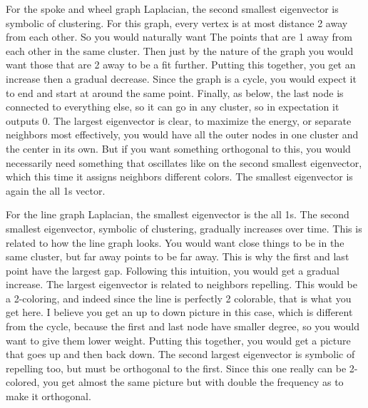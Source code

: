 \documentclass[12pt]{article}
\begin{document}
\begin{enumerate}[leftmargin=\labelsep, label=(\alph*)]
        For the spoke and wheel graph Laplacian, the second smallest eigenvector is symbolic of clustering. For this graph, every vertex is at most distance 2 away from each other. So you would naturally want The points that are 1 away from each other in the same cluster. Then just by the nature of the graph you would want those that are 2 away to be a fit further. Putting this together, you get an increase then a gradual decrease. Since the graph is a cycle, you would expect it to end and start at around the same point. Finally, as below, the last node is connected to everything else, so it can go in any cluster, so in expectation it outputs 0. The largest eigenvector is clear, to maximize the energy, or separate neighbors most effectively, you would have all the outer nodes in one cluster and the center in its own. But if you want something orthogonal to this, you would necessarily need something that oscillates like on the second smallest eigenvector, which this time it assigns neighbors different colors. The smallest eigenvector is again the all 1s vector.

        For the line graph Laplacian, the smallest eigenvector is the all 1s. The second smallest eigenvector, symbolic of clustering, gradually increases over time. This is related to how the line graph looks. You would want close things to be in the same cluster, but far away points to be far away. This is why the first and last point have the largest gap. Following this intuition, you would get a gradual increase. The largest eigenvector is related to neighbors repelling. This would be a 2-coloring, and indeed since the line is perfectly 2 colorable, that is what you get here. I believe you get an up to down picture in this case, which is different from the cycle, because the first and last node have smaller degree, so you would want to give them lower weight. Putting this together, you would get a picture that goes up and then back down. The second largest eigenvector is symbolic of repelling too, but must be orthogonal to the first. Since this one really can be 2-colored, you get almost the same picture but with double the frequency as to make it orthogonal.


\end{enumerate}
\end{document}

